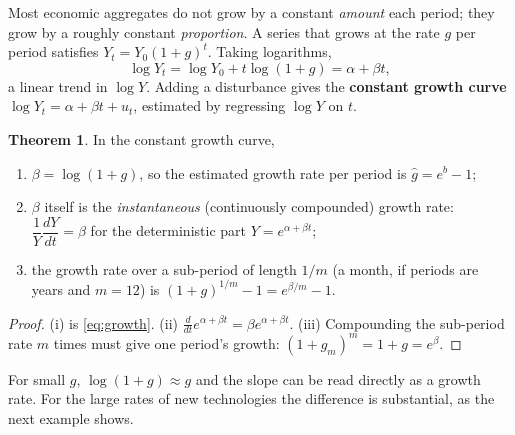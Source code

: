 \documentclass[11pt,a4paper]{article}
\numberwithin{equation}{section}
\theoremstyle{definition}
\newtheorem{thm}{Theorem}[subsection]
\begin{document}
Most economic aggregates do not grow by a constant \emph{amount} each period; they grow by a roughly constant \emph{proportion}. A series that
grows at the rate $g$ per period satisfies $Y_t = Y_0(1 + g)^t$. Taking logarithms,
\begin{equation}
\label{eq:growth}
\log Y_t = \log Y_0 + t\log(1 + g) = \alpha + \beta t ,
\end{equation}
a linear trend in $\log Y$. Adding a disturbance gives the \textbf{constant growth curve} $\log Y_t = \alpha + \beta t + u_t$, estimated by
regressing $\log Y$ on $t$.

\begin{thm}
\label{thm:growth}
In the constant growth curve,
\begin{enumerate}[label=(\roman*)]
\item $\beta = \log(1 + g)$, so the estimated growth rate per period is $\hat g = e^b - 1$;
\item $\beta$ itself is the \emph{instantaneous} (continuously compounded) growth rate: $\dfrac{1}{Y}\dfrac{dY}{dt} = \beta$ for the
deterministic part $Y = e^{\alpha + \beta t}$;
\item the growth rate over a sub-period of length $1/m$ (a month, if periods are years and $m = 12$) is $(1 + g)^{1/m} - 1 = e^{\beta/m} - 1$.
\end{enumerate}
\end{thm}

\begin{proof}
(i) is \eqref{eq:growth}. (ii) $\frac{d}{dt}e^{\alpha + \beta t} = \beta e^{\alpha + \beta t}$. (iii) Compounding the sub-period rate $m$ times must
give one period's growth: $(1 + g_m)^m = 1 + g = e^{\beta}$.
\end{proof}

For small $g$, $\log(1 + g) \approx g$ and the slope can be read directly as a growth rate. For the large rates of new technologies the
difference is substantial, as the next example shows.
\end{document}

